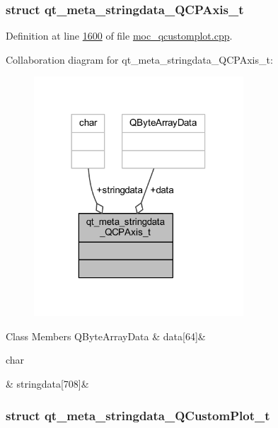 \subsubsection{struct qt\+\_\+meta\+\_\+stringdata\+\_\+\+Q\+C\+P\+Axis\+\_\+t}


Definition at line \hyperlink{a00067_source_l01600}{1600} of file \hyperlink{a00067_source}{moc\+\_\+qcustomplot.\+cpp}.



Collaboration diagram for qt\+\_\+meta\+\_\+stringdata\+\_\+\+Q\+C\+P\+Axis\+\_\+t\+:
\nopagebreak
\begin{figure}[H]
\begin{center}
\leavevmode
\includegraphics[width=222pt]{d2/d71/a00309}
\end{center}
\end{figure}
\begin{DoxyFields}{Class Members}
\hypertarget{a00067_a6de5289a2e23a98b0352a48533dedbd4}{Q\+Byte\+Array\+Data}\label{a00067_a6de5289a2e23a98b0352a48533dedbd4}
&
data\mbox{[}64\mbox{]}&
\\
\hline

\hypertarget{a00067_a1fe440f64883a266431cf43cff1b5052}{char}\label{a00067_a1fe440f64883a266431cf43cff1b5052}
&
stringdata\mbox{[}708\mbox{]}&
\\
\hline

\end{DoxyFields}
\label{dd/ded/a00211}
\hypertarget{a00067_dd/ded/a00211}{}
\subsubsection{struct qt\+\_\+meta\+\_\+stringdata\+\_\+\+Q\+Custom\+Plot\+\_\+t}


